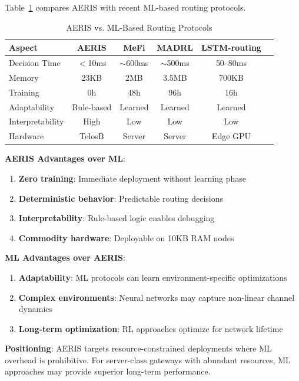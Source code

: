 Table~\ref{tab:ml_comparison_discussion} compares AERIS with recent
ML-based routing protocols.

\begin{table}[htbp]
\centering
\caption{AERIS vs. ML-Based Routing Protocols}
\label{tab:ml_comparison_discussion}
\begin{tabular}{@{}lccccc@{}}
\toprule
Aspect & AERIS & MeFi & MADRL & LSTM-routing \\
\midrule
Decision Time & $<$10ms & $\sim$600ms & $\sim$500ms & 50--80ms \\
Memory & 23KB & 2MB & 3.5MB & 700KB \\
Training & 0h & 48h & 96h & 16h \\
Adaptability & Rule-based & Learned & Learned & Learned \\
Interpretability & High & Low & Low & Low \\
Hardware & TelosB & Server & Server & Edge GPU \\
\bottomrule
\end{tabular}
\end{table}

\textbf{AERIS Advantages over ML}:
\begin{enumerate}
    \item \textbf{Zero training}: Immediate deployment without learning phase
    \item \textbf{Deterministic behavior}: Predictable routing decisions
    \item \textbf{Interpretability}: Rule-based logic enables debugging
    \item \textbf{Commodity hardware}: Deployable on 10KB RAM nodes
\end{enumerate}

\textbf{ML Advantages over AERIS}:
\begin{enumerate}
    \item \textbf{Adaptability}: ML protocols can learn environment-specific
    optimizations
    \item \textbf{Complex environments}: Neural networks may capture
    non-linear channel dynamics
    \item \textbf{Long-term optimization}: RL approaches optimize for
    network lifetime
\end{enumerate}

\textbf{Positioning}: AERIS targets resource-constrained deployments
where ML overhead is prohibitive. For server-class gateways with abundant
resources, ML approaches may provide superior long-term performance.

